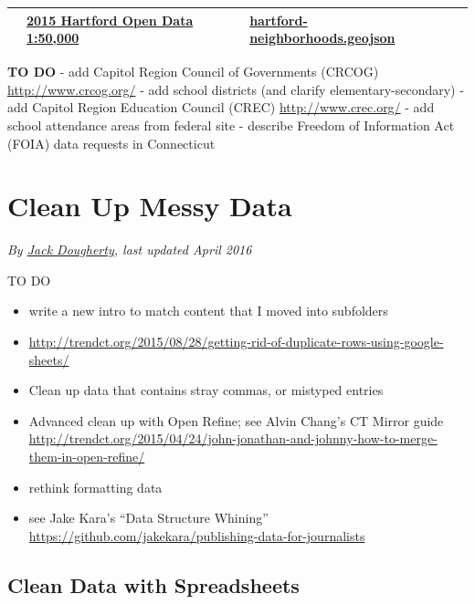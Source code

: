 \documentclass[
  english,
]{book}
\providecommand{\tightlist}{%
  \setlength{\itemsep}{0pt}\setlength{\parskip}{0pt}}
\begin{document}
\begin{longtable}[]{@{}llll@{}}
\begin{minipage}[t]{0.28\columnwidth}
\end{minipage} & \begin{minipage}[t]{0.22\columnwidth}\raggedright
\href{http://gisdata.hartford.gov/datasets/d3deb11bfd9242ce9c927187c512da9e_5}{2015 Hartford Open Data 1:50,000}\strut
\end{minipage} & \begin{minipage}[t]{0.19\columnwidth}\raggedright
\href{data/hartford-neighborhoods.geojson}{hartford-neighborhoods.geojson}\strut
\end{minipage} & \begin{minipage}[t]{0.19\columnwidth}\raggedright
\strut
\end{minipage}\tabularnewline
\bottomrule
\end{longtable}

\textbf{TO DO}
- add Capitol Region Council of Governments (CRCOG) \url{http://www.crcog.org/}
- add school districts (and clarify elementary-secondary)
- add Capitol Region Education Council (CREC) \url{http://www.crec.org/}
- add school attendance areas from federal site
- describe Freedom of Information Act (FOIA) data requests in Connecticut

\hypertarget{clean}{%
\chapter{Clean Up Messy Data}\label{clean}}

\emph{By \href{authors}{Jack Dougherty}, last updated April 2016}

TO DO

\begin{itemize}
\tightlist
\item
  write a new intro to match content that I moved into subfolders
\item
  \url{http://trendct.org/2015/08/28/getting-rid-of-duplicate-rows-using-google-sheets/}
\item
  Clean up data that contains stray commas, or mistyped entries
\item
  Advanced clean up with Open Refine; see Alvin Chang's CT Mirror guide \url{http://trendct.org/2015/04/24/john-jonathan-and-johnny-how-to-merge-them-in-open-refine/}
\item
  rethink formatting data
\item
  see Jake Kara's ``Data Structure Whining'' \url{https://github.com/jakekara/publishing-data-for-journalists}
\end{itemize}

\hypertarget{clean-spreadsheets}{%
\section{Clean Data with Spreadsheets}\label{clean-spreadsheets}}
\end{document}
